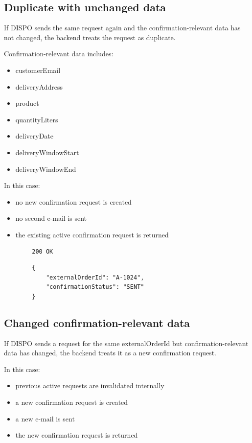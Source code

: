 \documentclass[a4paper,11pt]{article}
\begin{document}
	\subsection{Duplicate with unchanged data}
	
	If DISPO sends the same request again and the confirmation-relevant data has not changed, the backend treats the request as duplicate.
	
	Confirmation-relevant data includes:
	
	\begin{itemize}
		\item customerEmail
		\item deliveryAddress
		\item product
		\item quantityLiters
		\item deliveryDate
		\item deliveryWindowStart
		\item deliveryWindowEnd
	\end{itemize}
	
	In this case:
	
	\begin{itemize}
		\item no new confirmation request is created
		\item no second e-mail is sent
		\item the existing active confirmation request is returned
	\end{itemize}
	
	\begin{lstlisting}
		200 OK
	\end{lstlisting}
	
	\begin{lstlisting}
		{
			"externalOrderId": "A-1024",
			"confirmationStatus": "SENT"
		}
	\end{lstlisting}
	
	\subsection{Changed confirmation-relevant data}
	
	If DISPO sends a request for the same externalOrderId but confirmation-relevant data has changed, the backend treats it as a new confirmation request.
	
	In this case:
	
	\begin{itemize}
		\item previous active requests are invalidated internally
		\item a new confirmation request is created
		\item a new e-mail is sent
		\item the new confirmation request is returned
	\end{itemize}
	
\end{document}

